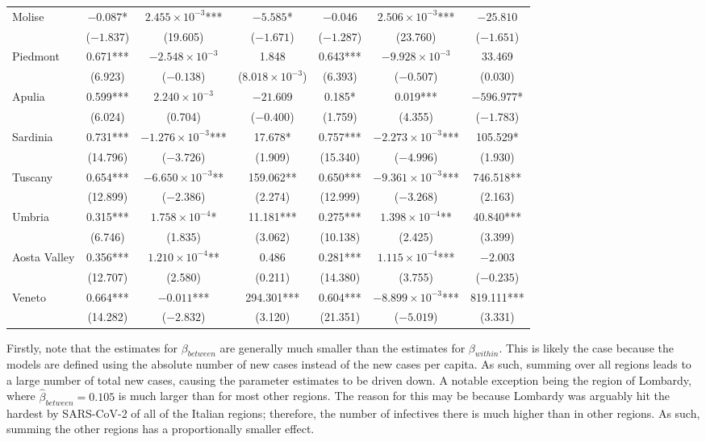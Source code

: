 \documentclass[12pt]{article}
\begin{document}
\begin{longtable}{@{}lcccccc@{}}
        Molise & $-0.087$* & $2.455 \times 10^{-3}$*** & $-5.585$* & $-0.046$ & $2.506 \times 10^{-3}$*** & $-25.810$ \\ 
         & ($-1.837$) & (19.605) & ($-1.671$) & ($-1.287$) & (23.760) & ($-1.651$) \\ 
        Piedmont & 0.671*** & $-2.548 \times 10^{-3}$ & 1.848 & 0.643*** & $-9.928 \times 10^{-3}$ & 33.469 \\ 
         & (6.923) & ($-0.138$) & ($8.018 \times 10^{-3}$) & (6.393) & ($-0.507$) & (0.030) \\ 
        Apulia & 0.599*** & $2.240 \times 10^{-3}$ & $-21.609$ & 0.185* & 0.019*** & $-596.977$* \\ 
         & (6.024) & (0.704) & ($-0.400$) & (1.759) & (4.355) & ($-1.783$) \\ 
        Sardinia & 0.731*** & $-1.276 \times 10^{-3}$*** & 17.678* & 0.757*** & $-2.273 \times 10^{-3}$*** & 105.529* \\ 
         & (14.796) & ($-3.726$) & (1.909) & (15.340) & ($-4.996$) & (1.930) \\ 
        Tuscany & 0.654*** & $-6.650 \times 10^{-3}$** & 159.062** & 0.650*** & $-9.361 \times 10^{-3}$*** & 746.518** \\ 
         & (12.899) & ($-2.386$) & (2.274) & (12.999) & ($-3.268$) & (2.163) \\ 
        Umbria & 0.315*** & $1.758 \times 10^{-4}$* & 11.181*** & 0.275*** & $1.398 \times 10^{-4}$** & 40.840*** \\ 
         & (6.746) & (1.835) & (3.062) & (10.138) & (2.425) & (3.399) \\ 
        Aosta Valley & 0.356*** & $1.210 \times 10^{-4}$** & 0.486 & 0.281*** & $1.115 \times 10^{-4}$*** & $-2.003$ \\ 
         & (12.707) & (2.580) & (0.211) & (14.380) & (3.755) & ($-0.235$) \\ 
        Veneto & 0.664*** & $-0.011$*** & 294.301*** & 0.604*** & $-8.899 \times 10^{-3}$*** & 819.111*** \\ 
         & (14.282) & ($-2.832$) & (3.120) & (21.351) & ($-5.019$) & (3.331) \\* \bottomrule
	\end{longtable}
	
    Firstly, note that the estimates for $\beta_{between}$ are generally much smaller than the estimates for $\beta_{within}$. This is likely the case because the models are defined using the absolute number of new cases instead of the new cases per capita. As such, summing over all regions leads to a large number of total new cases, causing the parameter estimates to be driven down. A notable exception being the region of Lombardy, where $\widehat{\beta}_{between} = 0.105$ is much larger than for most other regions. The reason for this may be because Lombardy was arguably hit the hardest by SARS-CoV-2 of all of the Italian regions; therefore, the number of infectives there is much higher than in other regions. As such, summing the other regions has a proportionally smaller effect.
    \\
	
\end{document}

